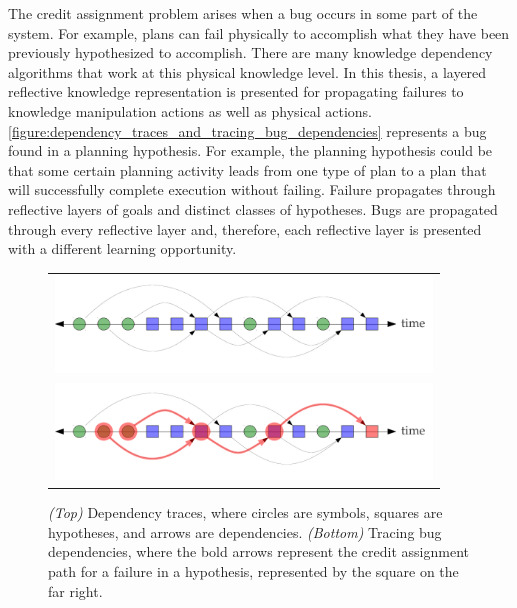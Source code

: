 The credit assignment problem arises when a bug occurs in some part of
the system.  For example, plans can fail physically to accomplish what
they have been previously hypothesized to accomplish.  There are many
knowledge dependency algorithms that work at this physical knowledge
level.  In this thesis, a layered reflective knowledge representation
is presented for propagating failures to knowledge manipulation
actions as well as physical actions.
{\mbox{\autoref{figure:dependency_traces_and_tracing_bug_dependencies}}}
represents a bug found in a planning hypothesis.  For example, the
planning hypothesis could be that some certain planning activity leads
from one type of plan to a plan that will successfully complete
execution without failing.  Failure propagates through reflective
layers of goals and distinct classes of hypotheses.  Bugs are
propagated through every reflective layer and, therefore, each
reflective layer is presented with a different learning opportunity.
\begin{figure}
\center
\begin{tabular}{c}
  \includegraphics[width=10cm]{gfx/dependency_traces} \\
  \includegraphics[width=10cm]{gfx/tracing_bug_dependencies}
\end{tabular}
\caption[Dependency traces and tracing bug dependencies.]{\emph{(Top)}
  Dependency traces, where circles are symbols, squares are
  hypotheses, and arrows are dependencies.  \emph{(Bottom)} Tracing
  bug dependencies, where the bold arrows represent the credit
  assignment path for a failure in a hypothesis, represented by the
  square on the far right.}
\label{figure:dependency_traces_and_tracing_bug_dependencies}
\end{figure}






